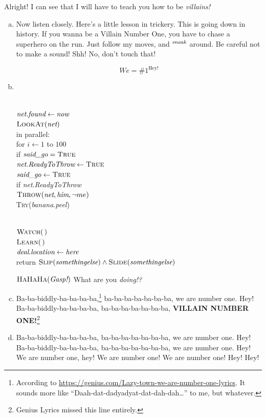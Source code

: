 \documentclass[11pt]{article}
\begin{document}
\begin{solution}[R. Rotten]
Alright! I can see that I will have to teach you how to be \emph{villains!}

\begin{enumerate}[(a)]
\item
Now listen closely.  Here's a little lesson in trickery.  This is going down in history.
If you wanna be a Villain Number One, you have to chase a superhero on the run.  Just follow my moves, and $^{\emph{sneak}}$ around.  Be careful not to make a sound!
Shh!  No, don't touch that!

\[
	We = \#1^\text{Hey!}
\]

\item~
\begin{algo}
	\+
\\	$\emph{net}.\emph{found} \gets \emph{now}$
\\	$\textsc{LookAt}(\emph{net})$
\\	in parallel:\+
\\		for $i\gets 1$ to $100$\+
\\			if $\emph{said\_go} = \textsc{True}$\+
\\				$\emph{net}.\emph{ReadyToThrow} \gets \textsc{True}$\-\-
\\		$\emph{said\_go} \gets \textsc{True}$\-
\\[0.5ex]
	if \emph{net}.\emph{ReadyToThrow}\+
\\		$\textsc{Throw}(\emph{net}, \emph{him}, \lnot me)$\-
\\	\textsc{Try}(\emph{banana}.\emph{peel})
\end{algo}

\begin{algo}
	\+
\\	$\textsc{Watch}(\,)$
\\	$\textsc{Learn}(\,)$
\\	$\emph{deal}.\emph{location} \gets \emph{here}$
\\	return $\textsc{Slip}(\emph{somethingelse}) \land
				\textsc{Slide}(\emph{somethingelse})$
\end{algo}

$\textsc{HaHaHa}(\emph{Gasp!})$   What are you \emph{doing!?}

\item
Ba-ba-biddly-ba-ba-ba-ba,\footnote{According to \url{https://genius.com/Lazy-town-we-are-number-one-lyrics}.  It sounds more like “Daah-dat-dadyadyat-dat-dah-dah\dots” to me, but whatever.} ba-ba-ba-ba-ba-ba-ba, we are number one. Hey!\\
Ba-ba-biddly-ba-ba-ba-ba, ba-ba-ba-ba-ba-ba-ba, \textbf{VILLAIN NUMBER ONE!}\footnote{Genius Lyrics missed this line entirely.}

\item
Ba-ba-biddly-ba-ba-ba-ba, ba-ba-ba-ba-ba-ba-ba, we are number one. Hey!\\
Ba-ba-biddly-ba-ba-ba-ba, ba-ba-ba-ba-ba-ba-ba, we are number one. Hey!\\
We are number one, hey!  We are number one!  We are number one!  Hey! Hey!
\end{enumerate}
\end{solution}
\end{document}
